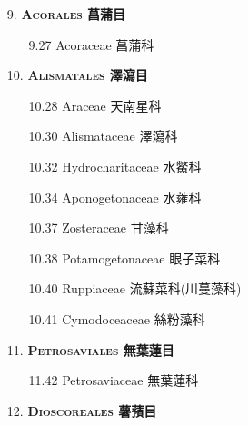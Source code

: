 \begin{enumerate}
  \item[9. ] \textbf{\textsc{Acorales} 菖蒲目}   
    \begin{enumerate}
      \item[9.27] Acoraceae 菖蒲科     
        
    \end{enumerate}
  \item[10. ] \textbf{\textsc{Alismatales} 澤瀉目}   
    \begin{enumerate}
      \item[10.28] Araceae 天南星科     
        
      \item[10.30] Alismataceae 澤瀉科     
        
      \item[10.32] Hydrocharitaceae 水鱉科     
        
      \item[10.34] Aponogetonaceae 水蕹科     
        
      \item[10.37] Zosteraceae 甘藻科     
        
      \item[10.38] Potamogetonaceae 眼子菜科     
        
      \item[10.40] Ruppiaceae 流蘇菜科(川蔓藻科)     
        
      \item[10.41] Cymodoceaceae 絲粉藻科     
        
    \end{enumerate}
  \item[11. ] \textbf{\textsc{Petrosaviales} 無葉蓮目}   
    \begin{enumerate}
      \item[11.42] Petrosaviaceae 無葉蓮科     
        
    \end{enumerate}
  \item[12. ] \textbf{\textsc{Dioscoreales} 薯蕷目}   

\end{enumerate}
